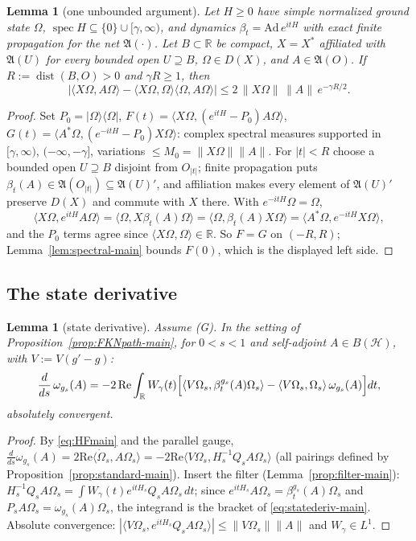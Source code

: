 \documentclass[11pt,a4paper]{article}
\theoremstyle{plain}
\newtheorem{lemma}[theorem]{Lemma}
\theoremstyle{definition}
\newcommand{\R}{\mathbb{R}}
\newcommand{\A}{\mathfrak{A}}
\newcommand{\HH}{\mathcal{H}}
\newcommand{\Om}{\Omega}
\newcommand{\ip}[2]{\langle #1,#2\rangle}
\DeclareMathOperator{\dist}{dist}
\DeclareMathOperator{\spec}{spec}
\begin{document}
\begin{lemma}[one unbounded argument]\label{prop:unbdd-main}
Let $H\ge0$ have simple normalized ground state $\Om$,
$\spec H\subseteq\{0\}\cup[\gamma,\infty)$, and dynamics $\beta_t=\mathrm{Ad}\,e^{itH}$ with
exact finite propagation for the net $\A(\cdot)$. Let $B\subset\R$ be compact, $X=X^*$
affiliated with $\A(U)$ for every bounded open $U\supseteq B$, $\Om\in D(X)$, and
$A\in\A(O)$. If $R:=\dist(B,O)>0$ and $\gamma R\ge1$, then
\[
  \bigl|\ip{X\Om}{A\Om}-\ip{X\Om}{\Om}\ip{\Om}{A\Om}\bigr|
  \le2\,\|X\Om\|\,\|A\|\,e^{-\gamma R/2} .
\]
\end{lemma}

\begin{proof}
Set $P_0=|\Om\rangle\langle\Om|$,
$F(t)=\ip{X\Om}{(e^{itH}-P_0)A\Om}$, $G(t)=\ip{A^*\Om}{(e^{-itH}-P_0)X\Om}$: complex spectral
measures supported in $[\gamma,\infty)$, $(-\infty,-\gamma]$, variations $\le M_0=\|X\Om\|\|A\|$.
For $|t|<R$ choose a bounded open $U\supseteq B$ disjoint from $O_{|t|}$; finite propagation
puts $\beta_t(A)\in\A(O_{|t|})\subseteq\A(U)'$, and affiliation makes every element of $\A(U)'$
preserve $D(X)$ and commute with $X$ there. With $e^{-itH}\Om=\Om$,
\[
  \ip{X\Om}{e^{itH}A\Om}=\ip{\Om}{X\beta_t(A)\Om}=\ip{\Om}{\beta_t(A)X\Om}
  =\ip{A^*\Om}{e^{-itH}X\Om},
\]
and the $P_0$ terms agree since $\ip{X\Om}{\Om}\in\R$. So $F=G$ on $(-R,R)$;
Lemma~\ref{lem:spectral-main} bounds $F(0)$, which is the displayed left side.
\end{proof}

\subsection{The state derivative}

\begin{lemma}[state derivative]\label{lem:derivative-main}
Assume \textup{(G)}. In the setting of Proposition~\ref{prop:FKNpath-main}, for $0<s<1$ and
self-adjoint $A\in B(\HH)$, with $V:=V(g'-g)$:
\begin{equation}\label{eq:statederiv-main}
  \frac d{ds}\,\omega_{g_s}(A)
  =-2\,\mathrm{Re}\int_\R W_\gamma(t)\Bigl[
  \ip{V\Om_s}{\beta^{g_s}_t(A)\Om_s}-\ip{V\Om_s}{\Om_s}\,\omega_{g_s}(A)\Bigr]dt ,
\end{equation}
absolutely convergent.
\end{lemma}

\begin{proof}
By \eqref{eq:HFmain} and the parallel gauge,
$\frac d{ds}\omega_{g_s}(A)=2\mathrm{Re}\ip{\dot\Om_s}{A\Om_s}
=-2\mathrm{Re}\ip{V\Om_s}{H_s^{-1}Q_sA\Om_s}$ (all pairings defined by
Proposition~\ref{prop:standard-main}). Insert the filter
(Lemma~\ref{prop:filter-main}): $H_s^{-1}Q_sA\Om_s=\int W_\gamma(t)e^{itH_s}Q_sA\Om_s\,dt$;
since $e^{itH_s}A\Om_s=\beta^{g_s}_t(A)\Om_s$ and $P_sA\Om_s=\omega_{g_s}(A)\Om_s$, the
integrand is the bracket of \eqref{eq:statederiv-main}. Absolute convergence:
$|\ip{V\Om_s}{e^{itH_s}Q_sA\Om_s}|\le\|V\Om_s\|\|A\|$ and $W_\gamma\in L^1$.
\end{proof}
\end{document}
